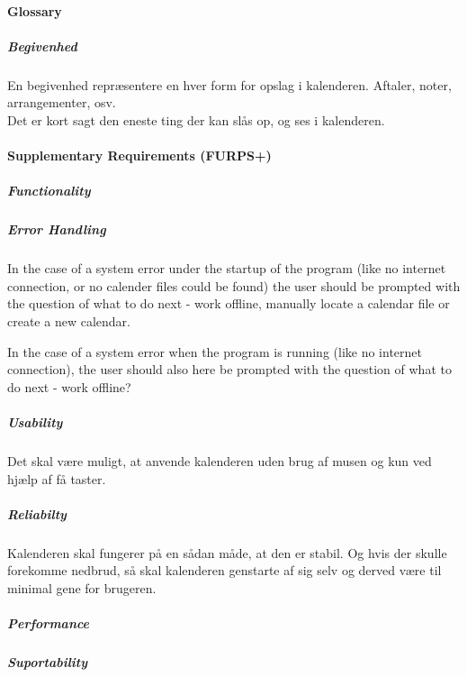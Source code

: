 \documentclass{article}
\begin{document}
	   \mbox{}
	
   \paragraph{Glossary} \mbox{}
\subparagraph{Begivenhed} \mbox{}

En begivenhed repræsentere en hver form for opslag i kalenderen. Aftaler, noter, arrangementer, osv. \\
Det er kort sagt den eneste ting der kan slås op, og ses i kalenderen.


   
   \paragraph{Supplementary Requirements (FURPS+)} \mbox{}
   \subparagraph{Functionality} \mbox{}
   
   \subparagraph{Error Handling} \mbox{}
   
   In the case of a system error under the startup of the program (like no internet connection, or no calender files could be found) the user should be prompted with the question of what to do next - work offline, manually locate a calendar file or create a new calendar. \linebreak
   
   In the case of a system error when the program is running (like no internet connection), the user should also here be prompted with the question of what to do next - work offline?
   \subparagraph{Usability} \mbox{}
   
   Det skal være muligt, at anvende kalenderen uden brug af musen og kun ved hjælp af få taster.
   \subparagraph{Reliabilty} \mbox{}
   
   Kalenderen skal fungerer på en sådan måde, at den er stabil. Og hvis der skulle forekomme nedbrud, så skal kalenderen genstarte af sig selv og derved være til minimal gene for brugeren.
   \subparagraph{Performance} \mbox{}
   
   
   \subparagraph{Suportability} \mbox{}
   
   
   
   
  
\end{document}
